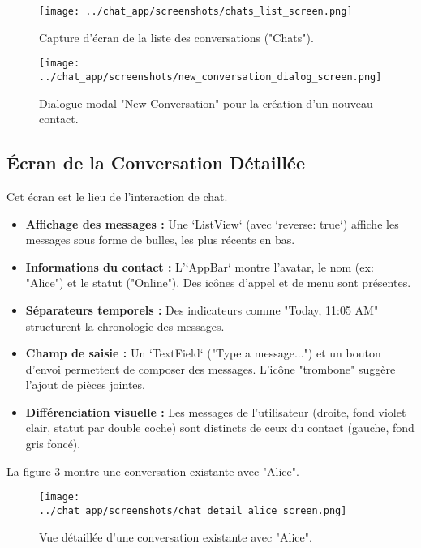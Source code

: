 \documentclass[12pt,a4paper]{article}
\begin{document}
\begin{figure}[htbp]
    \centering
    \texttt{[image: ../chat\_app/screenshots/chats\_list\_screen.png]} 
    \caption{Capture d'écran de la liste des conversations ("Chats").}
    \label{fig:chats_list_screen}
\end{figure}

\begin{figure}[htbp]
    \centering
    \texttt{[image: ../chat\_app/screenshots/new\_conversation\_dialog\_screen.png]} 
    \caption{Dialogue modal "New Conversation" pour la création d'un nouveau contact.}
    \label{fig:new_conversation_dialog_screen}
\end{figure}


\subsection{Écran de la Conversation Détaillée}
Cet écran est le lieu de l'interaction de chat.
\begin{itemize}
    \item \textbf{Affichage des messages :} Une `ListView` (avec `reverse: true`) affiche les messages sous forme de bulles, les plus récents en bas.
    \item \textbf{Informations du contact :} L'`AppBar` montre l'avatar, le nom (ex: "Alice") et le statut ("Online"). Des icônes d'appel et de menu sont présentes.
    \item \textbf{Séparateurs temporels :} Des indicateurs comme "Today, 11:05 AM" structurent la chronologie des messages.
    \item \textbf{Champ de saisie :} Un `TextField` ("Type a message...") et un bouton d'envoi permettent de composer des messages. L'icône "trombone" suggère l'ajout de pièces jointes.
    \item \textbf{Différenciation visuelle :} Les messages de l'utilisateur (droite, fond violet clair, statut par double coche) sont distincts de ceux du contact (gauche, fond gris foncé).
\end{itemize}



La figure \ref{fig:chat_detail_alice_screen} montre une conversation existante avec "Alice".

\begin{figure}[htbp]
    \centering
    \texttt{[image: ../chat\_app/screenshots/chat\_detail\_alice\_screen.png]} 
    \caption{Vue détaillée d'une conversation existante avec "Alice".}
    \label{fig:chat_detail_alice_screen}
\end{figure}
\end{document}
